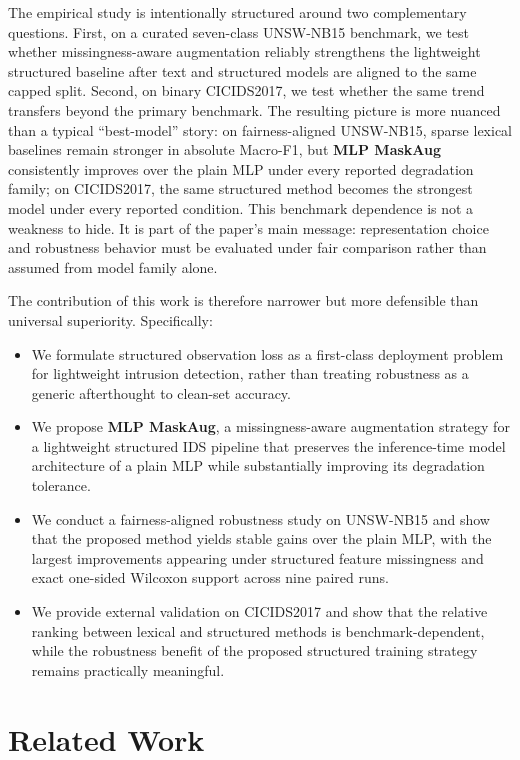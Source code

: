 The empirical study is intentionally structured around two complementary questions. First, on a curated seven-class UNSW-NB15 benchmark, we test whether missingness-aware augmentation reliably strengthens the lightweight structured baseline after text and structured models are aligned to the same capped split. Second, on binary CICIDS2017, we test whether the same trend transfers beyond the primary benchmark. The resulting picture is more nuanced than a typical ``best-model'' story: on fairness-aligned UNSW-NB15, sparse lexical baselines remain stronger in absolute Macro-F1, but \textbf{MLP MaskAug} consistently improves over the plain MLP under every reported degradation family; on CICIDS2017, the same structured method becomes the strongest model under every reported condition. This benchmark dependence is not a weakness to hide. It is part of the paper's main message: representation choice and robustness behavior must be evaluated under fair comparison rather than assumed from model family alone.

The contribution of this work is therefore narrower but more defensible than universal superiority. Specifically:
\begin{itemize}
\item We formulate structured observation loss as a first-class deployment problem for lightweight intrusion detection, rather than treating robustness as a generic afterthought to clean-set accuracy.
\item We propose \textbf{MLP MaskAug}, a missingness-aware augmentation strategy for a lightweight structured IDS pipeline that preserves the inference-time model architecture of a plain MLP while substantially improving its degradation tolerance.
\item We conduct a fairness-aligned robustness study on UNSW-NB15 and show that the proposed method yields stable gains over the plain MLP, with the largest improvements appearing under structured feature missingness and exact one-sided Wilcoxon support across nine paired runs.
\item We provide external validation on CICIDS2017 and show that the relative ranking between lexical and structured methods is benchmark-dependent, while the robustness benefit of the proposed structured training strategy remains practically meaningful.
\end{itemize}

\section{Related Work}
